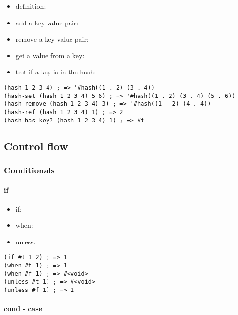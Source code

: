 \documentclass[a4paper,landscape,10pt]{article}
\begin{document}
\begin{multicols*}{2}
  \begin{itemize}
    \item definition: 
    \item add a key-value pair: 
    \item remove a key-value pair: 
    \item get a value from a key: 
    \item test if a key is in the hash: 
  \end{itemize}

  \begin{lstlisting}[language=Racket]
(hash 1 2 3 4) ; => '#hash((1 . 2) (3 . 4))
(hash-set (hash 1 2 3 4) 5 6) ; => '#hash((1 . 2) (3 . 4) (5 . 6))
(hash-remove (hash 1 2 3 4) 3) ; => '#hash((1 . 2) (4 . 4))
(hash-ref (hash 1 2 3 4) 1) ; => 2
(hash-has-key? (hash 1 2 3 4) 1) ; => #t
  \end{lstlisting}

  \subsection{Control flow}

  \subsubsection{Conditionals}

  \paragraph{if}

  \begin{itemize}
    \item if: 
    \item when: 
    \item unless: 
  \end{itemize}

  \begin{lstlisting}[language=Racket]
(if #t 1 2) ; => 1
(when #t 1) ; => 1
(when #f 1) ; => #<void>
(unless #t 1) ; => #<void>
(unless #f 1) ; => 1
  \end{lstlisting}

  \breakcolumn

  \paragraph{cond - case}


\end{multicols*}
\end{document}
